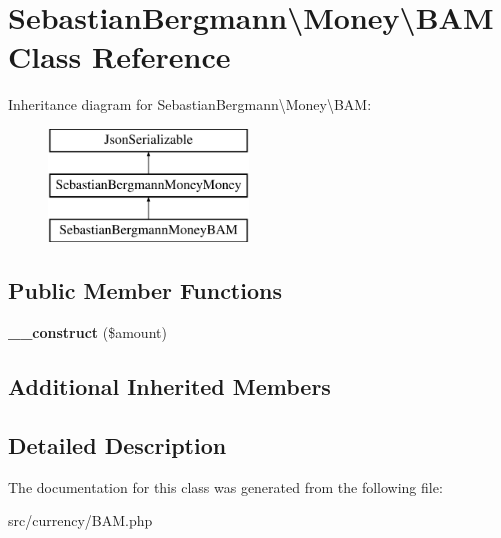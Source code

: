 \hypertarget{classSebastianBergmann_1_1Money_1_1BAM}{}\section{Sebastian\+Bergmann\textbackslash{}Money\textbackslash{}B\+A\+M Class Reference}
\label{classSebastianBergmann_1_1Money_1_1BAM}
Inheritance diagram for Sebastian\+Bergmann\textbackslash{}Money\textbackslash{}B\+A\+M\+:\begin{figure}[H]
\begin{center}
\leavevmode
\includegraphics[height=3.000000cm]{classSebastianBergmann_1_1Money_1_1BAM}
\end{center}
\end{figure}
\subsection*{Public Member Functions}
\begin{DoxyCompactItemize}
\item 
\hypertarget{classSebastianBergmann_1_1Money_1_1BAM_ab7621db491a75a7b5a15c3cb126bac38}{}{\bfseries \+\_\+\+\_\+construct} (\$amount)\label{classSebastianBergmann_1_1Money_1_1BAM_ab7621db491a75a7b5a15c3cb126bac38}

\end{DoxyCompactItemize}
\subsection*{Additional Inherited Members}


\subsection{Detailed Description}


The documentation for this class was generated from the following file\+:\begin{DoxyCompactItemize}
\item 
src/currency/B\+A\+M.\+php\end{DoxyCompactItemize}
